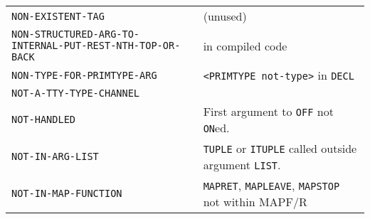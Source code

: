 \documentclass[a4paper,]{article}
\begin{document}
\begin{longtable}[]{@{}ll@{}}
\begin{minipage}[t]{0.58\columnwidth}
\texttt{NON-EXISTENT-TAG}\strut
\end{minipage} & \begin{minipage}[t]{0.36\columnwidth}\raggedright\strut
(unused)\strut
\end{minipage}\tabularnewline
\begin{minipage}[t]{0.58\columnwidth}\raggedright\strut
\texttt{NON-STRUCTURED-ARG-TO-INTERNAL-PUT-REST-NTH-TOP-OR-BACK}\strut
\end{minipage} & \begin{minipage}[t]{0.36\columnwidth}\raggedright\strut
in compiled code\strut
\end{minipage}\tabularnewline
\begin{minipage}[t]{0.58\columnwidth}\raggedright\strut
\texttt{NON-TYPE-FOR-PRIMTYPE-ARG}\strut
\end{minipage} & \begin{minipage}[t]{0.36\columnwidth}\raggedright\strut
\texttt{\textless{}PRIMTYPE\ not-type\textgreater{}} in \texttt{DECL}\strut
\end{minipage}\tabularnewline
\begin{minipage}[t]{0.58\columnwidth}\raggedright\strut
\texttt{NOT-A-TTY-TYPE-CHANNEL}\strut
\end{minipage} & \begin{minipage}[t]{0.36\columnwidth}\raggedright\strut
\strut
\end{minipage}\tabularnewline
\begin{minipage}[t]{0.58\columnwidth}\raggedright\strut
\texttt{NOT-HANDLED}\strut
\end{minipage} & \begin{minipage}[t]{0.36\columnwidth}\raggedright\strut
First argument to \texttt{OFF} not \texttt{ON}ed.\strut
\end{minipage}\tabularnewline
\begin{minipage}[t]{0.58\columnwidth}\raggedright\strut
\texttt{NOT-IN-ARG-LIST}\strut
\end{minipage} & \begin{minipage}[t]{0.36\columnwidth}\raggedright\strut
\texttt{TUPLE} or \texttt{ITUPLE} called outside argument \texttt{LIST}.\strut
\end{minipage}\tabularnewline
\begin{minipage}[t]{0.58\columnwidth}\raggedright\strut
\texttt{NOT-IN-MAP-FUNCTION}\strut
\end{minipage} & \begin{minipage}[t]{0.36\columnwidth}\raggedright\strut
\texttt{MAPRET}, \texttt{MAPLEAVE}, \texttt{MAPSTOP} not within MAPF/R\strut

\end{minipage}
\end{longtable}
\end{document}
